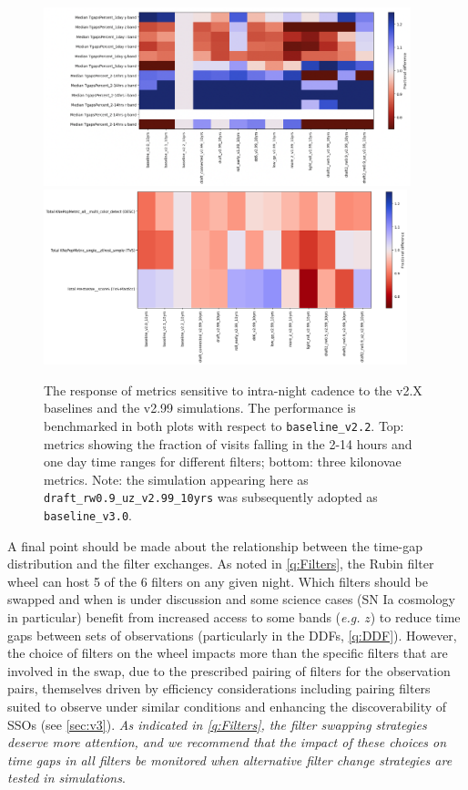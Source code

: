 \begin{figure}
\includegraphics[width=0.95\textwidth, right]{figures/tgaps.png}
\includegraphics[width=0.94\textwidth, right]{figures/kne.png}
\caption{The response of metrics sensitive to intra-night cadence to the v2.X baselines and the v2.99 simulations. The performance is benchmarked in both plots with respect to \texttt{baseline\_v2.2}. Top: metrics showing the fraction of visits falling in the 2-14 hours and one day time ranges for different filters; bottom: three kilonovae metrics. Note: the simulation appearing here as \texttt{draft\_rw0.9\_uz\_v2.99\_10yrs} was subsequently adopted as \texttt{baseline\_v3.0}.}
\label{fig:tgaps}
\end{figure}

A final point should be made about the relationship between the time-gap distribution and the filter exchanges. As noted in \autoref{q:Filters}, the Rubin filter wheel can host 5 of the 6 filters on any given night. Which filters should be swapped and when is under discussion and some science cases (SN Ia cosmology in particular) benefit from increased access to some bands (\emph{e.g.} $z$) to reduce time gaps between sets of observations (particularly in the DDFs, \autoref{q:DDF}). However, the choice of filters on the wheel impacts more than the specific filters that are involved in the swap, due to the prescribed pairing of filters for the observation pairs, themselves driven by efficiency considerations including pairing filters suited to observe under similar conditions and enhancing the discoverability of SSOs (see \autoref{sec:v3}). \emph{As indicated in \autoref{q:Filters}, the filter swapping strategies deserve more attention, and we recommend that the impact of these choices on time gaps in all filters be monitored when alternative filter change strategies are tested in simulations}.